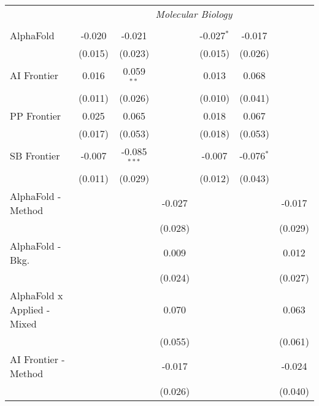 \begin{tabular}{lcccccc}
 & \multicolumn{6}{c}{\textit{Molecular Biology}} \\ \\
   AlphaFold                     & -0.020  & -0.021         &               & -0.027$^{*}$ & -0.017       &   \\   
                                 & (0.015) & (0.023)        &               & (0.015)      & (0.026)      &   \\   
   AI Frontier                   & 0.016   & 0.059$^{**}$   &               & 0.013        & 0.068        &   \\   
                                 & (0.011) & (0.026)        &               & (0.010)      & (0.041)      &   \\   
   PP Frontier                   & 0.025   & 0.065          &               & 0.018        & 0.067        &   \\   
                                 & (0.017) & (0.053)        &               & (0.018)      & (0.053)      &   \\   
   SB Frontier                   & -0.007  & -0.085$^{***}$ &               & -0.007       & -0.076$^{*}$ &   \\   
                                 & (0.011) & (0.029)        &               & (0.012)      & (0.043)      &   \\   
   AlphaFold - Method            &         &                & -0.027        &              &              & -0.017\\   
                                 &         &                & (0.028)       &              &              & (0.029)\\   
   AlphaFold - Bkg.              &         &                & 0.009         &              &              & 0.012\\   
                                 &         &                & (0.024)       &              &              & (0.027)\\   
   AlphaFold x Applied - Mixed   &         &                & 0.070         &              &              & 0.063\\   
                                 &         &                & (0.055)       &              &              & (0.061)\\   
   AI Frontier - Method          &         &                & -0.017        &              &              & -0.024\\   
                                 &         &                & (0.026)       &              &              & (0.040)\\   

\end{tabular}

